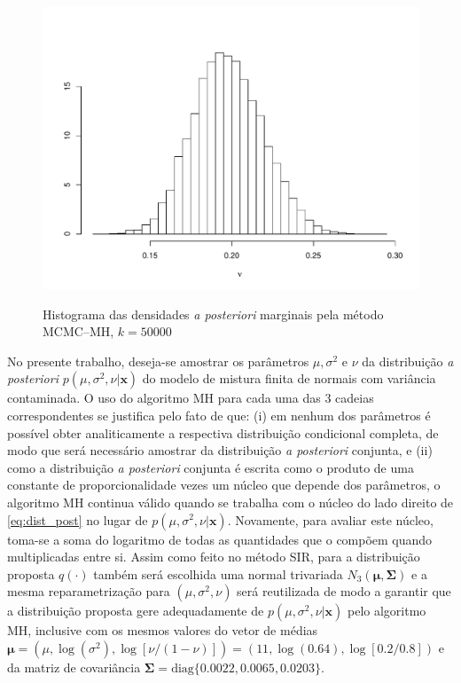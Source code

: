 \documentclass[12pt,reqno,a4paper,oneside]{article}
\begin{document}
\begin{figure}[t]
{{			\includegraphics[scale=0.4]{figuras/nu_mh_50000.pdf}}}%
	\caption{Histograma das densidades \textit{a posteriori} marginais pela método MCMC--MH, $k = 50000$}%
\end{figure}

No presente trabalho, deseja-se amostrar os parâmetros $\mu, \sigma^2$ e $\nu$ da distribuição \textit{a posteriori} $p(\mu, \sigma^2, \nu | \bm{x})$ do modelo de mistura finita de normais com variância contaminada. O uso do algoritmo MH para cada uma das 3 cadeias correspondentes se justifica pelo fato de que: (i) em nenhum dos parâmetros é possível obter analiticamente a respectiva distribuição condicional completa, de modo que será necessário amostrar da distribuição \textit{a posteriori} conjunta, e (ii) como a distribuição \textit{a posteriori} conjunta é escrita como o produto de uma constante de proporcionalidade vezes um núcleo que depende dos parâmetros, o algoritmo MH continua válido quando se trabalha com o núcleo do lado direito de \eqref{eq:dist_post} no lugar de $p(\mu, \sigma^2, \nu | \bm{x})$. Novamente, para avaliar este núcleo, toma-se a soma do logaritmo de todas as quantidades que o compõem quando multiplicadas entre si. Assim como feito no método SIR, para a distribuição proposta $q(\cdot)$ também será escolhida uma normal trivariada $N_3(\bm{\mu}, \bm{\Sigma})$ e a mesma reparametrização para $(\mu, \sigma^2, \nu)$ será reutilizada de modo a garantir que a distribuição proposta gere adequadamente de $p(\mu, \sigma^2, \nu | \bm{x})$ pelo algoritmo MH, inclusive com os mesmos valores do vetor de médias $\bm{\mu} = (\mu, \log(\sigma^2), \log[\nu/(1-\nu)]) = (11, \log(0.64), \log[0.2/0.8])$ e da matriz de covariância $\bm{\Sigma} = \textrm{diag}\{0.0022, 0.0065, 0.0203\}$.
\end{document}
